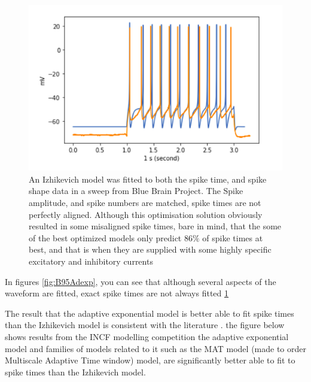 \begin{figure}
    \centering
    \includegraphics{figures/IZHI_B95.png}
    \caption{An Izhikevich model was fitted to both the spike time, and spike shape data in a sweep from Blue Brain Project. The Spike amplitude, and spike numbers are matched, spike times are not perfectly aligned. Although this optimisation solution obviously resulted in some misaligned spike times, bare in mind, that the some of the best optimized models only predict $86\%$ of spike times at best, and that is when they are supplied with some highly specific excitatory and inhibitory currents}
    \label{fig:B95_IZHI}
\end{figure}

In figures \ref{fig:B95Adexp}, you can see that although several aspects of the waveform are fitted, exact spike times are not always fitted \ref{fig:B95_IZHI}

The result that the adaptive exponential model is better able to fit spike times than the Izhikevich model is consistent with the literature \cite{rossant2011fitting}. the figure below shows results from the INCF modelling competition the adaptive exponential model and families of models related to it such as the MAT model (made to order Multiscale Adaptive Time window) model, are significantly better able to fit to spike times than the Izhikevich model.



